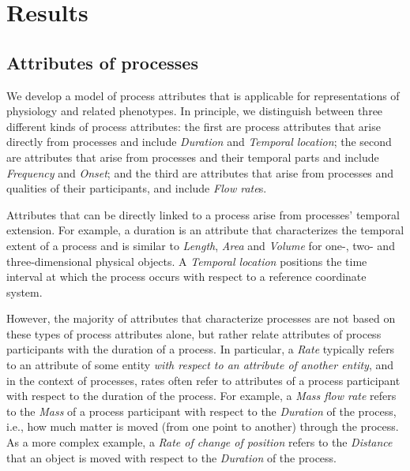 \documentclass{bioinfo}
\begin{document}
\section{Results}
\subsection{Attributes of processes}
We develop a model of process attributes that is applicable for
representations of physiology and related phenotypes. In principle, we
distinguish between three different kinds of process attributes: the
first are process attributes that arise directly from processes and
include {\em Duration} and {\em Temporal location}; the second are
attributes that arise from processes and their temporal parts and
include {\em Frequency} and {\em Onset}; and the third are attributes
that arise from processes and qualities of their participants, and
include {\em Flow rate}s.

Attributes that can be directly linked to a process arise from
processes' temporal extension. For example, a duration is an attribute
that characterizes the temporal extent of a process and is similar to
{\em Length}, {\em Area} and {\em Volume} for one-, two- and
three-dimensional physical objects. A {\em Temporal location}
positions the time interval at which the process occurs with respect
to a reference coordinate system.

However, the majority of attributes that characterize processes are
not based on these types of process attributes alone, but rather
relate attributes of process participants with the duration of a
process. In particular, a {\em Rate} typically refers to an attribute
of some entity {\em with respect to an attribute of another entity},
and in the context of processes, rates often refer to attributes of a
process participant with respect to the duration of the process. For
example, a {\em Mass flow rate} refers to the {\em Mass} of a process
participant with respect to the {\em Duration} of the process, i.e.,
how much matter is moved (from one point to another) through the
process.  As a more complex example, a {\em Rate of change of
  position} refers to the {\em Distance} that an object is moved with
respect to the {\em Duration} of the process.
\end{document}
